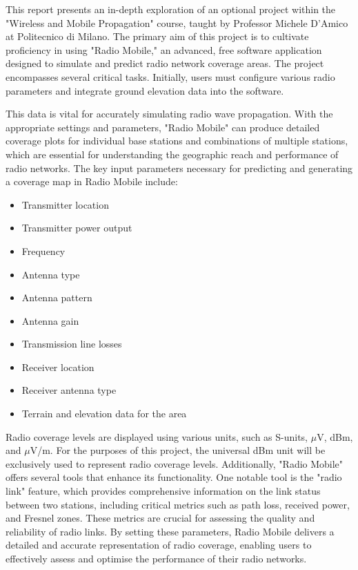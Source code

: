 This report presents an in-depth exploration of an optional project within the "Wireless and Mobile Propagation" course, taught by Professor Michele D’Amico at Politecnico di Milano.
The primary aim of this project is to cultivate proficiency in using "Radio Mobile," an advanced, free software application designed to simulate and predict radio network coverage areas.
The project encompasses several critical tasks.
Initially, users must configure various radio parameters and integrate ground elevation data into the software.

This data is vital for accurately simulating radio wave propagation.
With the appropriate settings and parameters, "Radio Mobile" can produce detailed coverage plots for individual base stations and combinations of multiple stations, which are essential for understanding the geographic reach and performance of radio networks.
The key input parameters necessary for predicting and generating a coverage map
in Radio Mobile include:
\begin{itemize}
    \item Transmitter location
    \item Transmitter power output
\item Frequency
\item Antenna type
\item Antenna pattern
\item Antenna gain
\item Transmission line losses
\item Receiver location
\item Receiver antenna type
\item Terrain and elevation data for the area
\end{itemize}

Radio coverage levels are displayed using various units, such as S-units, $\mu$V, dBm,
and $\mu$V/m.
For the purposes of this project, the universal dBm unit will be exclusively
used to represent radio coverage levels.
Additionally, "Radio Mobile" offers several tools that enhance its functionality.
One notable tool is the "radio link" feature, which provides comprehensive information on the link status between two stations, including critical metrics such as path loss, received power, and Fresnel zones.
These metrics are crucial for assessing the quality and reliability of radio links.
By setting these parameters, Radio Mobile delivers a detailed and accurate representation of radio coverage, enabling users to effectively assess and optimise the performance of their radio networks.
